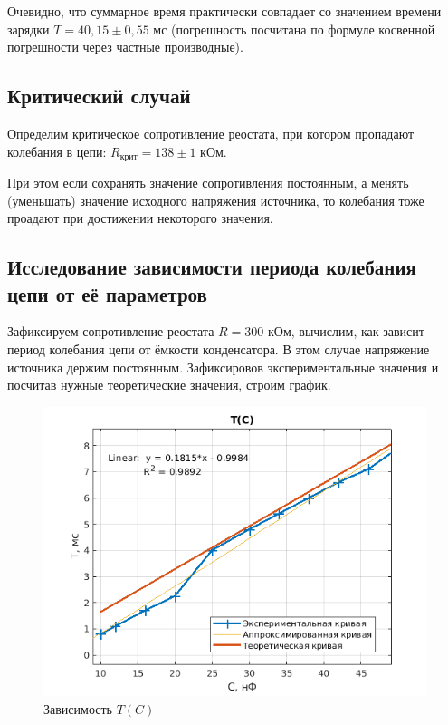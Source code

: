 Очевидно, что суммарное время практически совпадает со значением времени зарядки $T = 40,15 \pm 0,55$ мс (погрешность посчитана по формуле косвенной погрешности через частные производные).

\subsection{Критический случай}

Определим критическое сопротивление реостата, при котором пропадают колебания в цепи: $R_{\text{крит}} = 138 \pm 1$ кОм.

При этом если сохранять значение сопротивления постоянным, а менять (уменьшать) значение исходного напряжения источника, то колебания тоже проадают при достижении некоторого значения.

\subsection{Исследование зависимости периода колебания цепи от её параметров}

Зафиксируем сопротивление реостата $R = 300$ кОм, вычислим, как зависит период колебания цепи от ёмкости конденсатора. В этом случае напряжение источника держим постоянным.
Зафиксировов экспериментальные значения и посчитав нужные теоретические значения, строим график.

\begin{figure}[h]
    \centering
    \includegraphics[width = 10 cm]{images/TC.png}
    \caption{Зависимость $T(C)$}
    \label{TC}
\end{figure}


